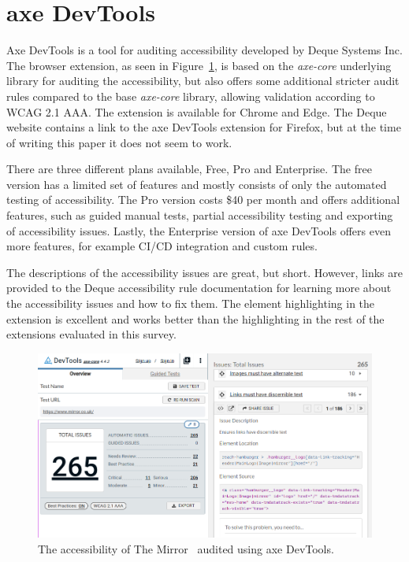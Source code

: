 \section{axe DevTools}
Axe DevTools \parencite{axe_devtools} is a tool for auditing accessibility developed by Deque Systems Inc.
The browser extension, as seen in Figure~\ref{fig:axe-devtools-ext}, is based on the \emph{axe-core} underlying library for auditing the accessibility, but also offers some additional stricter audit rules compared to the base \emph{axe-core} library, allowing validation according to WCAG 2.1 AAA.
The extension is available for Chrome and Edge.
The Deque website contains a link to the axe DevTools extension for Firefox, but at the time of writing this paper it does not seem to work.

There are three different plans available, Free, Pro and Enterprise.
The free version has a limited set of features and mostly consists of only the automated testing of accessibility.
The Pro version costs \$40 per month and offers additional features, such as guided manual tests, partial accessibility testing and exporting of accessibility issues.
Lastly, the Enterprise version of axe DevTools offers even more features, for example CI/CD integration and custom rules.

The descriptions of the accessibility issues are great, but short.
However, links are provided to the Deque accessibility rule documentation for learning more about the accessibility issues and how to fix them.
The element highlighting in the extension is excellent and works better than the highlighting in the rest of the extensions evaluated in this survey.


\begin{figure}[tp]
\centering
\includegraphics[keepaspectratio,width=\linewidth,height=\halfh]
{images/axe-devtools-ext.png}

\caption[axe DevTools]{
The accessibility of The Mirror~\parencite{MirrorUK} audited using axe DevTools.
}
\label{fig:axe-devtools-ext}
\end{figure}


